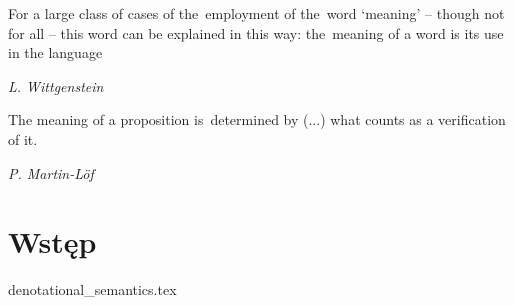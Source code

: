  
\epigraph{
For a large class of cases of the~employment of the~word ‘meaning’ -- though not for all -- this word can be explained in this way: the~meaning of a word is its use in the language
}{\emph{\small{L. Wittgenstein}}}

\epigraph{The meaning of a proposition is~determined by (...) what counts as a
verification of it. \cite{Lof_96}}{\emph{\small{{P. Martin-Löf}}}}


\section{Wstęp}
{denotational_semantics.tex}

